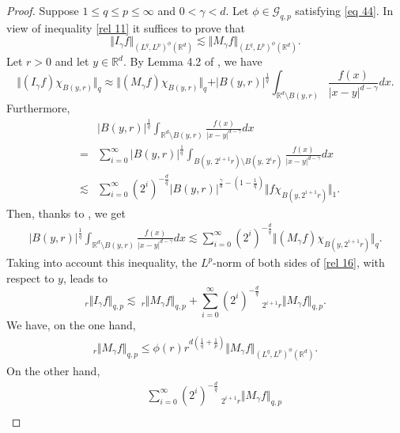 \documentclass[a4paper,12pt,intlimits,oneside]{amsart}
\numberwithin{equation}{section}
\numberwithin{equation}{section}
\theoremstyle{definition}
\begin{document}
\begin{proof}
Suppose $1\leq  q \leq p \leq \infty$ and $0<\gamma< d$. Let $\phi \in \mathcal{G}_{q,p}$ satisfying \eqref{eq 44}. In view of inequality \eqref{rel 11} it suffices to prove that $$\Vert I_{\gamma}f \Vert_{(L^{q},L^{p})^{\phi}(\mathbb{R}^{d})}  \lesssim   \Vert M_{\gamma}f \Vert_{(L^{q},L^{p})^{\phi}(\mathbb{R}^{d})}.$$
Let $r>0$ and let $y \in \mathbb{R}^{d}$. By Lemma 4.2 of \cite{GoM}, we have
\begin{equation}\label{rel 16}
 \Vert (I_{\gamma}f) \chi_{B(y,r)} \Vert_{q} \approx \Vert (M_{\gamma}f) \chi_{B(y,r)} \Vert_{q} + \vert B(y,r) \vert^{\frac{1}{q}} \int_{\mathbb{R}^{d}\setminus B(y,r)}\frac{f(x)}{\left|x-y\right|^{d-\gamma}}dx.
\end{equation}
Furthermore,
\begin{eqnarray*}
& & \vert B(y,r) \vert^{\frac{1}{q}} \int_{\mathbb{R}^{d}\setminus B(y,r)}\frac{f(x)}{\left|x-y\right|^{d-\gamma}}dx \\
 &=&  \sum\limits^{\infty}_{i=0} \vert B(y,r) \vert^{\frac{1}{q}}  \displaystyle\int_{ B(y,\, 2^{i+1}r)\setminus B(y,\, 2^{i}r) } \frac{f(x)}{\left|x-y\right|^{d-\gamma}} dx\\ &\lesssim&  \sum\limits^{\infty}_{i=0} (2^{i})^{-\frac{d}{q}}\vert B(y,r) \vert^{\frac{\gamma}{d}-(1-\frac{1}{q})}  \Vert f \chi_{B(y,2^{i+1}r)} \Vert_{1}.
\end{eqnarray*}
Then, thanks to \cite[Theorem 5.2]{GoM}, we get
\begin{eqnarray*}
\vert B(y,r) \vert^{\frac{1}{q}} \int_{\mathbb{R}^{d}\setminus B(y,r)}\frac{f(x)}{\left|x-y\right|^{d-\gamma}}dx \lesssim  \sum\limits^{\infty}_{i=0} (2^{i})^{-\frac{d}{q}}  \Vert (M_{\gamma}f) \chi_{B(y,2^{i+1}r)} \Vert_{q}.
\end{eqnarray*}
Taking into
account this inequality, the $ L^{p}$-norm of both sides of \eqref{rel 16}, with respect to $y$, leads to
$$_{r}\Vert I_{\gamma}f \Vert_{q,p} \lesssim \: _{r}\Vert M_{\gamma}f \Vert_{q,p} +  \sum\limits^{\infty}_{i=0} (2^{i})^{-\frac{d}{q}}  \: _{2^{i+1}r}\Vert M_{\gamma}f \Vert_{q,p}.  $$
We have, on the one hand,
\begin{eqnarray} \label{eq 5}
_{r}\Vert M_{\gamma}f \Vert_{q,p} \leq \phi(r)r^{d(\frac{1}{q}+\frac{1}{p})}\Vert M_{\gamma}f \Vert_{(L^{q},L^{p})^{\phi}(\mathbb{R}^{d})}.
\end{eqnarray}
On the other hand,
\begin{eqnarray*}
& &\sum\limits^{\infty}_{i=0} (2^{i})^{-\frac{d}{q}}  \: _{2^{i+1}r}\Vert M_{\gamma}f \Vert_{q,p}\\

\end{eqnarray*}
\end{proof}
\end{document}
